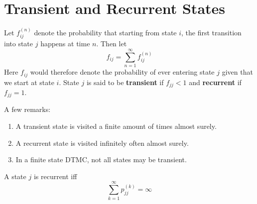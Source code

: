 \documentclass[a4paper,10pt]{article}
\begin{document}
\section{Transient and Recurrent States}
\begin{defn}
Let $f_{ij}^{(n)}$ denote the probability that starting from state $i$, the first transition into state $j$ happens at time $n$. Then let
\[f_{ij} = \sum_{n=1}^\infty f_{ij}^{(n)}\]
Here $f_{ij}$ would therefore denote the probability of ever entering state $j$ given that we start at state $i$. State $j$ is said to be \textbf{transient} if $f_{jj} < 1$ and \textbf{recurrent} if $f_{jj}=1$. 
\end{defn}
A few remarks:
\begin{enumerate}
	\item A transient state is visited a finite amount of times almost surely.
	\item A recurrent state is visited infinitely often almost surely.
	\item In a finite state DTMC, not all states may be transient. 
\end{enumerate}
\begin{prop}
A state $j$ is recurrent iff
\[\sum_{k=1}^\infty p_{jj}^{(k)} = \infty\]
\end{prop}
\end{document}
